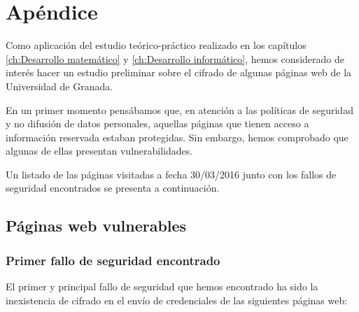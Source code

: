 \chapter{Apéndice}


\begin{center}
\end{center}

Como aplicación del estudio teórico-práctico realizado en los capítulos \ref{ch:Desarrollo matemático} y \ref{ch:Desarrollo informático}, hemos considerado de interés hacer un estudio preliminar sobre el cifrado de algunas páginas web de la Universidad de Granada.

En un primer momento pensábamos que, en atención a las políticas de seguridad y no difusión de datos personales, aquellas páginas que tienen acceso a información reservada estaban protegidas. Sin embargo, hemos comprobado que algunas de ellas presentan vulnerabilidades.

Un listado de las páginas visitadas a fecha 30/03/2016 junto con los fallos de seguridad encontrados se presenta a continuación.

\section*{Páginas web vulnerables}

\subsection*{Primer fallo de seguridad encontrado}

El primer y principal fallo de seguridad que hemos encontrado ha sido la inexistencia de cifrado en el envío de credenciales de las siguientes páginas web:

